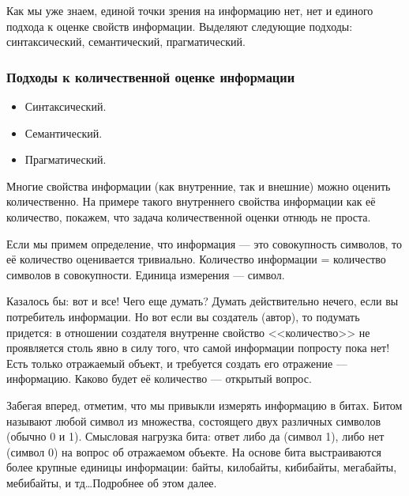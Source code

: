 Как мы уже знаем, единой точки зрения на информацию нет, нет и единого подхода к оценке свойств информации. Выделяют следующие подходы: синтаксический, семантический, прагматический.

\begin{frame}
\frametitle{Подходы к количественной оценке информации}
\begin{itemize}
    \item Синтаксический. 
    
    \item Семантический. 
    
    \item Прагматический. 
\end{itemize} 
\end{frame}


Многие свойства информации (как внутренние, так и внешние) можно оценить количественно. На примере такого внутреннего свойства информации как её количество, покажем, что задача количественной оценки отнюдь не проста.

Если мы примем определение, что информация --- это совокупность символов, то её количество оценивается тривиально. Количество информации = количество символов в совокупности. Единица измерения --- символ. 

Казалось бы: вот и все! Чего еще думать? Думать действительно нечего, если вы потребитель информации. Но вот если вы создатель (автор), то подумать придется: в отношении создателя внутренне свойство <<количество>> не проявляется столь явно в силу того, что самой информации попросту пока нет! Есть только отражаемый объект, и требуется создать его отражение --- информацию. Каково будет её количество --- открытый вопрос.

Забегая вперед, отметим, что мы привыкли измерять информацию в битах. Битом называют любой символ из множества, состоящего двух различных символов (обычно 0 и 1). Смысловая нагрузка бита: ответ либо да (символ 1), либо нет (символ 0) на вопрос об отражаемом объекте. На основе бита выстраиваются более крупные единицы информации: байты, килобайты, кибибайты, мегабайты, мебибайты, и тд\ldots Подробнее об этом далее.

